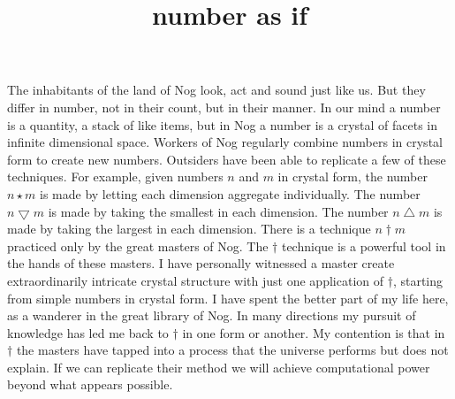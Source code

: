 \documentclass[12pt]{article}
\title{number as if}
\newcommand{\gcd}{\operatorname{gcd}}
\def\gcd{\bigtriangledown}
\def\lcm{\bigtriangleup}
\begin{document}
\maketitle

The inhabitants of the land of Nog look, act and sound just like us.  But they differ in number,
not in their count, but in their manner. In our mind a number is a quantity, a stack of like items, but in Nog
a number is a crystal of facets in infinite dimensional space. Workers of Nog regularly combine numbers in crystal form
to create new numbers.  Outsiders have been able to replicate a few of these techniques.   For example, given numbers $n$ and $m$ in crystal form, the
number $n\star m$ is made by letting each dimension aggregate individually. The number $n\gcd m$ is made by taking the
smallest in each dimension.  The number $n\lcm m$ is made by taking the
largest in each dimension.  There is a technique $n\dagger m$ practiced only by the great masters of Nog.  The $\dagger$ technique is a powerful
tool in the hands of these masters.  I have personally witnessed a master create extraordinarily intricate crystal structure with just one application of $\dagger$, starting from simple
numbers in crystal form.  I have spent the better part of my life here, as a wanderer in the great library of Nog.  In many directions my pursuit of knowledge has led me back to $\dagger$
in one form or another.  My contention is that in $\dagger$ the masters have tapped into a process that the universe performs but does not explain. If we can replicate their method
we will achieve computational power beyond what appears possible.
\end{document}
